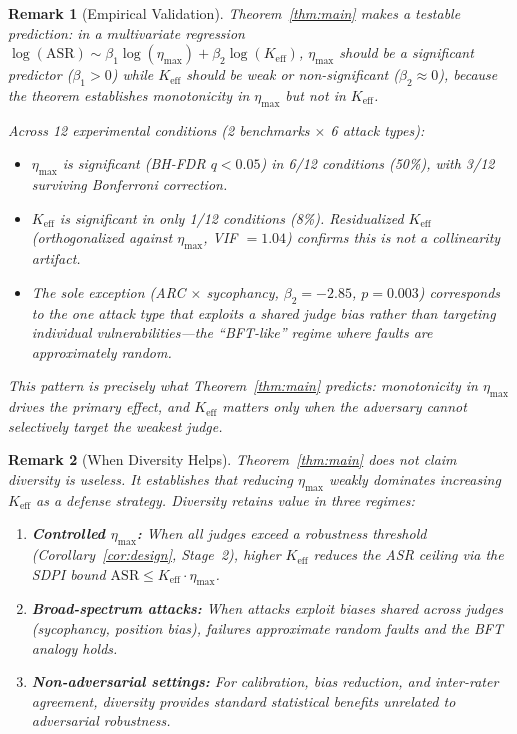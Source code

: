 \documentclass[11pt]{article}
\newtheorem*{remark}{Remark}
\begin{document}
\begin{remark}[Empirical Validation]
Theorem~\ref{thm:main} makes a testable prediction: in a multivariate regression $\log(\mathrm{ASR}) \sim \beta_1 \log(\eta_{\max}) + \beta_2 \log(K_{\mathrm{eff}})$, $\eta_{\max}$ should be a significant predictor ($\beta_1 > 0$) while $K_{\mathrm{eff}}$ should be weak or non-significant ($\beta_2 \approx 0$), because the theorem establishes monotonicity in $\eta_{\max}$ but not in $K_{\mathrm{eff}}$.

Across 12 experimental conditions (2 benchmarks $\times$ 6 attack types):
\begin{itemize}
    \item $\eta_{\max}$ is significant (BH-FDR $q < 0.05$) in 6/12 conditions (50\%), with 3/12 surviving Bonferroni correction.
    \item $K_{\mathrm{eff}}$ is significant in only 1/12 conditions (8\%). Residualized $K_{\mathrm{eff}}$ (orthogonalized against $\eta_{\max}$, VIF $= 1.04$) confirms this is not a collinearity artifact.
    \item The sole exception (ARC $\times$ sycophancy, $\beta_2 = -2.85$, $p = 0.003$) corresponds to the one attack type that exploits a \emph{shared} judge bias rather than targeting individual vulnerabilities---the ``BFT-like'' regime where faults are approximately random.
\end{itemize}
This pattern is precisely what Theorem~\ref{thm:main} predicts: monotonicity in $\eta_{\max}$ drives the primary effect, and $K_{\mathrm{eff}}$ matters only when the adversary cannot selectively target the weakest judge.
\end{remark}

\begin{remark}[When Diversity Helps]
Theorem~\ref{thm:main} does \emph{not} claim diversity is useless. It establishes that \emph{reducing $\eta_{\max}$ weakly dominates increasing $K_{\mathrm{eff}}$} as a defense strategy. Diversity retains value in three regimes:
\begin{enumerate}[label=(\roman*)]
    \item \textbf{Controlled $\eta_{\max}$:} When all judges exceed a robustness threshold (Corollary~\ref{cor:design}, Stage~2), higher $K_{\mathrm{eff}}$ reduces the ASR ceiling via the SDPI bound $\mathrm{ASR} \leq K_{\mathrm{eff}} \cdot \eta_{\max}$.
    \item \textbf{Broad-spectrum attacks:} When attacks exploit biases shared across judges (sycophancy, position bias), failures approximate random faults and the BFT analogy holds.
    \item \textbf{Non-adversarial settings:} For calibration, bias reduction, and inter-rater agreement, diversity provides standard statistical benefits unrelated to adversarial robustness.
\end{enumerate}
\end{remark}
\end{document}
